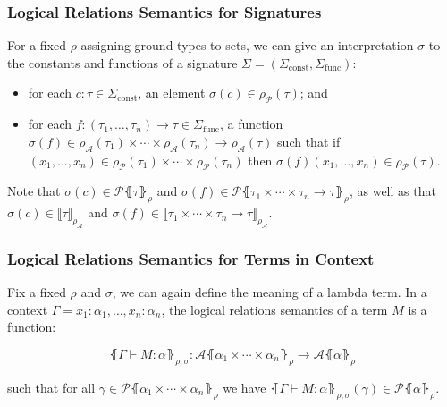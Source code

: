 \documentclass[aspectratio=169]{beamer}
\begin{document}
\begin{frame}
\frametitle{Logical Relations Semantics for Signatures}

For a fixed $\rho$ assigning ground types to sets, we can give an interpretation $\sigma$  to the constants and functions of a signature $\Sigma = (\Sigma_{\text{const}}, \Sigma_{\text{func}})$:
\begin{itemize}
    \item for each $c : \tau \in \Sigma_{\text{const}}$, an element $\sigma(c) \in \rho_{\mathcal{P}}(\tau)$; and
    \item for each $f : (\tau_1, \ldots, \tau_n) \to \tau \in \Sigma_{\text{func}}$, a function $\sigma(f) \in \rho_{\mathcal{A}}(\tau_1) \times \cdots \times \rho_{\mathcal{A}}(\tau_n) \to \rho_{\mathcal{A}}(\tau)$ such that if $(x_1, \ldots, x_n) \in \rho_{\mathcal{P}}(\tau_1) \times \cdots \times \rho_{\mathcal{P}}(\tau_n)$ then $\sigma(f)(x_1, \ldots, x_n) \in \rho_{\mathcal{P}}(\tau)$.
\end{itemize}
Note that $\sigma(c) \in \mathcal{P}\lBrace \tau \rBrace_{\rho}$ and $\sigma(f) \in \mathcal{P}\lBrace \tau_1 \times \cdots \times \tau_n \rightarrow \tau \rBrace_{\rho}$, as well as that $\sigma(c) \in \llbracket \tau \rrbracket_{\rho_{\mathcal{A}}}$ and $\sigma(f) \in \llbracket \tau_1 \times \cdots \times \tau_n \rightarrow \tau \rrbracket_{\rho_{\mathcal{A}}}$.
\end{frame}

\begin{frame}
\frametitle{Logical Relations Semantics for Terms in Context}

Fix a fixed $\rho$ and $\sigma$, we can again define the meaning of a lambda term.
In a context $\Gamma = x_1 : \alpha_1, \ldots, x_n : \alpha_n$, the logical relations semantics of a term $M$ is a function:

\[
\lBrace \Gamma \vdash M : \alpha \rBrace_{\rho, \sigma} : \mathcal{A}\lBrace \alpha_1 \times \cdots \times \alpha_n \rBrace_\rho \to \mathcal{A}\lBrace \alpha \rBrace_\rho
\]

such that for all $\gamma \in \mathcal{P}\lBrace \alpha_1 \times \cdots \times \alpha_n \rBrace_\rho$ we have $\lBrace \Gamma \vdash M : \alpha \rBrace_{\rho, \sigma}(\gamma) \in \mathcal{P}\lBrace \alpha \rBrace_\rho$.

\end{frame}
\end{document}
